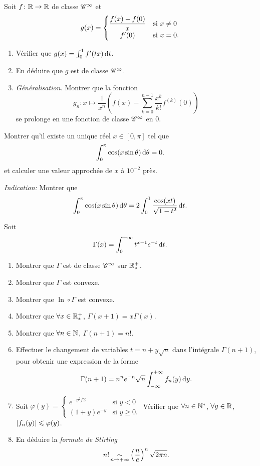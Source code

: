 \documentclass{yann}
\begin{document}

Soit $f\colon\mathbb{R}\to\mathbb{R}$ de classe $\mathscr{C}^{\infty}$ et
\[ g(x) = \begin{cases}
  \dfrac{f(x)-f(0)}{x} & \text{si } x\neq0 \\
  \hfil f'(0)               & \text{si } x=0.
\end{cases} \]
\begin{enumerate}
\item
Vérifier que $g(x) = \int_0^1 f'(tx) \mathop{}\!\mathrm{d} t$.
\item
En déduire que $g$ est de classe $\mathscr{C}^{\infty}$.
\item
\emph{Généralisation.}
  Montrer que la fonction
  \[ g_n \colon x \mapsto \frac{1}{x^n}
  \left( f(x) - \sum_{k=0}^{n-1} \frac{x^k}{k!} f^{(k)}(0) \right) \]
  se prolonge en une fonction de classe $\mathscr{C}^{\infty}$ en $0$.
\end{enumerate}

\Exercice

Montrer qu'il existe un unique réel $x\in[0,\pi]$ tel que
\[ \int_0^\pi \cos(x\sin\theta) \mathop{}\!\mathrm{d}\theta = 0. \]
et calculer une valeur approchée de $x$ à $10^{-2}$ près.

\emph{Indication:} Montrer que
\[ \int_0^\pi \cos(x\sin\theta) \mathop{}\!\mathrm{d}\theta = 2\int_0^1 \frac{\cos(xt)}{\sqrt{1-t^2}} \mathop{}\!\mathrm{d} t. \]


Soit \[ \Gamma(x) = \int_0^{+\infty} t^{x-1} e^{-t} \mathop{}\!\mathrm{d} t. \]
\begin{enumerate}
\item
Montrer que $\Gamma$ est de classe $\mathscr{C}^{\infty}$ sur $\mathbb{R}^+_*$.
\item
Montrer que $\Gamma$ est convexe.
\item
Montrer que $\ln\circ\Gamma$ est convexe.
\item
Montrer que $\forall x\in\mathbb{R}^+_*$, $\Gamma(x+1) = x\Gamma(x)$.
\item
Montrer que $\forall n\in\mathbb{N}$, $\Gamma(n+1) = n!$.
\item
Effectuer le changement de variables $t = n + y\sqrt n$
  dans l'intégrale $\Gamma(n+1)$,
  pour obtenir une expression de la forme
  \[ \Gamma(n+1) = n^n e^{-n} \sqrt n \int_{-\infty}^{+\infty} f_n(y) \mathop{}\!\mathrm{d} y. \]
\item
Soit $\varphi(y) = \begin{cases}
  e^{-y^2/2}  & \text{si } y < 0 \\
  (1+y)e^{-y} & \text{si } y\geq0.
\end{cases}$
  Vérifier que $\forall n\in\mathbb{N}^*$, $\forall y\in\mathbb{R}$, $\left|{f_n(y)}\right|\leqslant\varphi(y)$.
\item
En déduire la \emph{formule de Stirling}
  \[ n! \operatorname*{\sim}_{n\to+\infty} \left( \frac{n}{e} \right)^n \sqrt{2\pi n}. \]
\end{enumerate}
\end{document}
